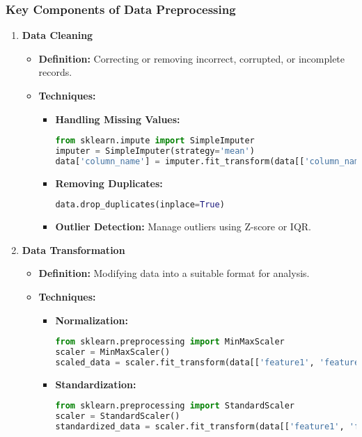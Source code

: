 \documentclass[aspectratio=169]{beamer}
\begin{document}
\begin{frame}[fragile]
    \frametitle{Key Components of Data Preprocessing}
    \begin{enumerate}
        \item \textbf{Data Cleaning}
        \begin{itemize}
            \item \textbf{Definition:} Correcting or removing incorrect, corrupted, or incomplete records.
            \item \textbf{Techniques:}
            \begin{itemize}
                \item \textbf{Handling Missing Values:}
                \begin{lstlisting}[language=Python]
from sklearn.impute import SimpleImputer
imputer = SimpleImputer(strategy='mean')
data['column_name'] = imputer.fit_transform(data[['column_name']])
                \end{lstlisting}
                \item \textbf{Removing Duplicates:}
                \begin{lstlisting}[language=Python]
data.drop_duplicates(inplace=True)
                \end{lstlisting}
                \item \textbf{Outlier Detection:} Manage outliers using Z-score or IQR.
            \end{itemize}
        \end{itemize}
        \item \textbf{Data Transformation}
        \begin{itemize}
            \item \textbf{Definition:} Modifying data into a suitable format for analysis.
            \item \textbf{Techniques:}
            \begin{itemize}
                \item \textbf{Normalization:}
                \begin{lstlisting}[language=Python]
from sklearn.preprocessing import MinMaxScaler
scaler = MinMaxScaler()
scaled_data = scaler.fit_transform(data[['feature1', 'feature2']])
                \end{lstlisting}
                \item \textbf{Standardization:}
                \begin{lstlisting}[language=Python]
from sklearn.preprocessing import StandardScaler
scaler = StandardScaler()
standardized_data = scaler.fit_transform(data[['feature1', 'feature2']])
                \end{lstlisting}
            \end{itemize}
        \end{itemize}
    \end{enumerate}
\end{frame}
\end{document}
